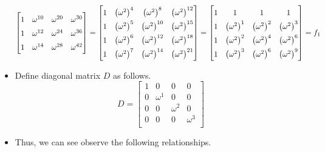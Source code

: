 \documentclass{article}
\begin{document}
\begin{itemize}
\begin{equation*}
\begin{bmatrix}
            1 & \omega^{10} & \omega^{20} & \omega^{30}\\
            1 & \omega^{12} & \omega^{24} & \omega^{36}\\
            1 & \omega^{14} & \omega^{28} & \omega^{42}\\
        \end{bmatrix}
        =
        \renewcommand{\arraystretch}{1.5}
        \begin{bmatrix}
            1 & \left( \omega^2 \right)^4 & \left( \omega^2 \right)^8    & \left( \omega^2 \right)^{12}\\
            1 & \left( \omega^2 \right)^5 & \left( \omega^2 \right)^{10} & \left( \omega^2 \right)^{15}\\
            1 & \left( \omega^2 \right)^6 & \left( \omega^2 \right)^{12} & \left( \omega^2 \right)^{18}\\
            1 & \left( \omega^2 \right)^7 & \left( \omega^2 \right)^{14} & \left( \omega^2 \right)^{21}\\
        \end{bmatrix}
        =
        \begin{bmatrix}
            1 & 1 & 1 & 1\\
            1 & \left( \omega^2 \right)^1 & \left( \omega^2 \right)^2 & \left( \omega^2 \right)^3\\
            1 & \left( \omega^2 \right)^2 & \left( \omega^2 \right)^4 & \left( \omega^2 \right)^6\\
            1 & \left( \omega^2 \right)^3 & \left( \omega^2 \right)^6 & \left( \omega^2 \right)^9\\
        \end{bmatrix}
        = f_1
    \end{equation*}
    \item Define diagonal matrix $D$ as follows.
    \begin{equation*}
        D =
        \begin{bmatrix}
            1 & 0 & 0 & 0\\
            0 & \omega^1 & 0 & 0\\
            0 & 0 & \omega^2 & 0\\
            0 & 0 & 0 & \omega^3\\
        \end{bmatrix}
    \end{equation*}
    \item Thus, we can see observe the following relationships.
    \begin{equation*}

\end{equation*}
\end{itemize}
\end{document}

